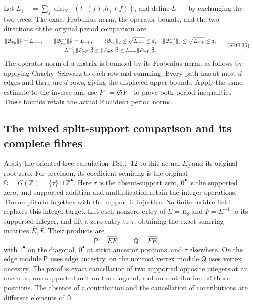 Let
\(L_{+-}=\sum_f\operatorname{dist}_{\mathcal T_-}
(t_+(f),h_+(f))\), and define \(L_{-+}\) by exchanging the two
trees. The exact Frobenius norm, the operator bounds, and the two
directions of the original period comparison are
\[
 \begin{gathered}
 \|\mathfrak S_{\theta_0}\|_{\rm F}^2=L_{+-},\qquad
 \|\mathfrak S_{\theta_0}^{-1}\|_{\rm F}^2=L_{-+},\qquad
 \|\mathfrak S_{\theta_0}\|_2\le\sqrt{L_{+-}}\le d,
 \quad \|\mathfrak S_{\theta_0}^{-1}\|_2\le\sqrt{L_{-+}}\le d,\\
 L_{-+}^{-1}\|P_-p\|_2^2
     \le\|P_+p\|_2^2\le L_{+-}\|P_-p\|_2^2.
 \end{gathered}
 \tag{SPG.35}\label{GraphV2:eq:spg-path-norms}
\]
The operator norm of a matrix is bounded by its Frobenius norm,
as follows by applying Cauchy--Schwarz to each row and summing.
Every path has at most \(d\) edges and there are \(d\) rows,
giving the displayed upper bounds. Apply the same estimate to the
inverse and use \(P_+=\mathfrak S P_-\) to prove both period
inequalities. These bounds retain the actual Euclidean period norms.

\subsection{The mixed split-support comparison and its complete fibres}

Apply the oriented-tree calculation TSI.1--12 to this actual
\(E_\theta\) and its original root zero. For precision, its
coefficient semiring is the original
\(\mathbb G=G(\mathbb Z)=\{\tau\}\sqcup\mathbb Z^\bullet\).
Here \(\tau\) is the absent-support zero, \(0^\bullet\) is the
supported zero, and supported addition and multiplication retain
the integer operations. The amplitude together with the support
is injective. No finite residue field replaces this integer target.
Lift each nonzero entry of \(E=E_\theta\) and \(F=E^{-1}\)
to its supported integer, and lift a zero entry to \(\tau\),
obtaining the exact semiring matrices \(\widehat E,\widehat F\).
Their products are
\[
 \mathsf P=\widehat E\widehat F,\qquad
 \mathsf Q=\widehat F\widehat E,
 \tag{SPG.36}\label{GraphV2:eq:spg-split-products}
\]
with \(1^\bullet\) on the diagonal, \(0^\bullet\) at strict
ancestor positions, and \(\tau\) elsewhere. On the edge module
\(\mathsf P\) uses edge ancestry; on the nonroot vertex module
\(\mathsf Q\) uses vertex ancestry. The proof is exact cancellation
of two supported opposite integers at an ancestor, one supported
unit on the diagonal, and no contribution off those positions.
The absence of a contribution and the cancellation of contributions
are different elements of \(\mathbb G\).

